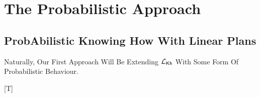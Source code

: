 \section{The Probabilistic Approach}


\subsection{ProbAbilistic Knowing How With Linear Plans}
Naturally, Our First Approach Will Be Extending $\mathcal{L}_{{\mathsf{Kh}}}$ With Some Form Of Probabilistic Behaviour. 





[T]



